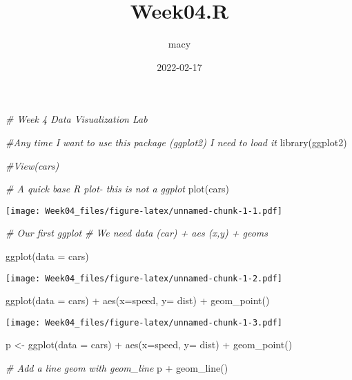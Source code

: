 \documentclass[
]{article}
\title{Week04.R}
\author{macy}
\date{2022-02-17}
\newenvironment{Shaded}{\begin{snugshade}}{\end{snugshade}}
\newcommand{\AttributeTok}[1]{\textcolor[rgb]{0.77,0.63,0.00}{#1}}
\newcommand{\CommentTok}[1]{\textcolor[rgb]{0.56,0.35,0.01}{\textit{#1}}}
\newcommand{\FunctionTok}[1]{\textcolor[rgb]{0.00,0.00,0.00}{#1}}
\newcommand{\NormalTok}[1]{#1}
\newcommand{\OtherTok}[1]{\textcolor[rgb]{0.56,0.35,0.01}{#1}}
\newcommand{\SpecialCharTok}[1]{\textcolor[rgb]{0.00,0.00,0.00}{#1}}
\begin{document}
\maketitle

\begin{Shaded}
\begin{Highlighting}[]
\CommentTok{\# Week 4 Data Visualization Lab}

\CommentTok{\#Any time I want to use this package (ggplot2) I need to load it}
\FunctionTok{library}\NormalTok{(ggplot2)}

\CommentTok{\#View(cars)}

\CommentTok{\# A quick base R plot{-} this is not a ggplot}
\FunctionTok{plot}\NormalTok{(cars)}
\end{Highlighting}
\end{Shaded}

\texttt{[image: Week04\_files/figure-latex/unnamed-chunk-1-1.pdf]}

\begin{Shaded}
\begin{Highlighting}[]
\CommentTok{\# Our first ggplot}
\CommentTok{\# We need data (car) + aes (x,y) + geoms}

\FunctionTok{ggplot}\NormalTok{(}\AttributeTok{data =}\NormalTok{ cars)}
\end{Highlighting}
\end{Shaded}

\texttt{[image: Week04\_files/figure-latex/unnamed-chunk-1-2.pdf]}

\begin{Shaded}
\begin{Highlighting}[]
\FunctionTok{ggplot}\NormalTok{(}\AttributeTok{data =}\NormalTok{ cars) }\SpecialCharTok{+}
  \FunctionTok{aes}\NormalTok{(}\AttributeTok{x=}\NormalTok{speed, }\AttributeTok{y=}\NormalTok{ dist) }\SpecialCharTok{+}
  \FunctionTok{geom\_point}\NormalTok{()}
\end{Highlighting}
\end{Shaded}

\texttt{[image: Week04\_files/figure-latex/unnamed-chunk-1-3.pdf]}

\begin{Shaded}
\begin{Highlighting}[]
\NormalTok{p }\OtherTok{\textless{}{-}} \FunctionTok{ggplot}\NormalTok{(}\AttributeTok{data =}\NormalTok{ cars) }\SpecialCharTok{+}
  \FunctionTok{aes}\NormalTok{(}\AttributeTok{x=}\NormalTok{speed, }\AttributeTok{y=}\NormalTok{ dist) }\SpecialCharTok{+}
  \FunctionTok{geom\_point}\NormalTok{()}

\CommentTok{\# Add a line geom with geom\_line}
\NormalTok{p }\SpecialCharTok{+} \FunctionTok{geom\_line}\NormalTok{()}
\end{Highlighting}
\end{Shaded}
\end{document}
